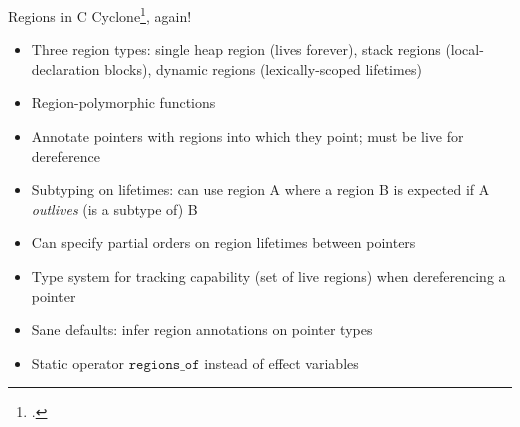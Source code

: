 \documentclass[aspectratio=169]{beamer}
\begin{document}
\begin{frame}{Regions in C}
    Cyclone\footcite{grossman_region-based_2002}, again!
    \begin{itemize}[<+->]
        \item Three region types: single heap region (lives forever), stack regions (local-declaration blocks), dynamic regions (lexically-scoped lifetimes)
        \item Region-polymorphic functions
        \item Annotate pointers with regions into which they point; must be live for dereference
        \item Subtyping on lifetimes: can use region A where a region B is expected if A \emph{outlives} (is a subtype of) B
        \item Can specify partial orders on region lifetimes between pointers
        \item Type system for tracking capability (set of live regions) when dereferencing a pointer %
        \item Sane defaults: infer region annotations on pointer types  %
        \item Static operator $\texttt{regions\_of}$ instead of effect variables
    \end{itemize}
    \vspace{0.1in}
\end{frame}
\end{document}
